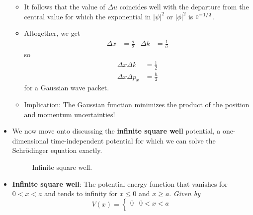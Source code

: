 \documentclass[../notes.tex]{subfiles}
\begin{document}
\begin{itemize}
\begin{itemize}
\begin{itemize}
        \end{itemize}
        \item It follows that the value of $\Delta u$ coincides well with the departure from the central value for which the exponential in $|\psi|^2$ or $|\phi|^2$ is $\e[-1/2]$.
        \item Altogether, we get
        \begin{align*}
            \Delta x &= \frac{\sigma}{2}&
            \Delta k &= \frac{1}{\sigma}
        \end{align*}
        so
        \begin{align*}
            \Delta x\Delta k &= \frac{1}{2}\\
            \Delta x\Delta p_x &= \frac{\hbar}{2}
        \end{align*}
        for a Gaussian wave packet.
        \item Implication: The Gaussian function minimizes the product of the position and momentum uncertainties!
    \end{itemize}
    \item We now move onto discussing the \textbf{infinite square well} potential, a one-dimensional time-independent potential for which we can solve the Schr\"{o}dinger equation exactly.
    \begin{figure}[h!]
        \centering
        \caption{Infinite square well.}
        \label{fig:infiniteSquareWell}
    \end{figure}
    \item \textbf{Infinite square well}: The potential energy function that vanishes for $0<x<a$ and tends to infinity for $x\leq 0$ and $x\geq a$. \emph{Given by}
    \begin{equation*}
        V(x) =
        \begin{cases}
            0 & 0<x<a\\

\end{cases}
\end{equation*}
\end{itemize}
\end{document}
